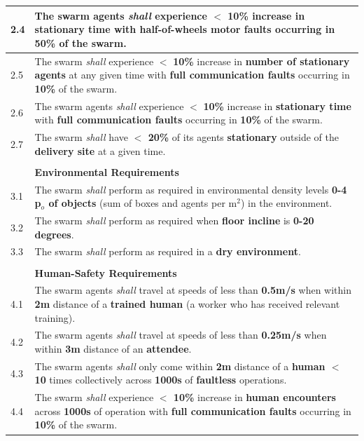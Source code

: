 \documentclass[runningheads]{llncs}
\begin{document}
\begin{table}[!t]
\begin{tabular}{p{5mm} p{125mm} }
		\hline
		2.4 & The swarm agents \emph{shall} experience $<$ \textbf{10\%} increase in \textbf{stationary time} with \textbf{half-of-wheels motor faults} occurring in \textbf{50\%} of  the swarm.\\ 
		\hline
		2.5 & The swarm \emph{shall} experience $<$ \textbf{10\%} increase in \textbf{number of stationary agents} at any given time with \textbf{full communication faults} occurring in \textbf{10\%} of the swarm.\\
		\hline
		2.6 & The swarm agents \emph{shall} experience $<$ \textbf{10\%} increase in \textbf{stationary time} with \textbf{full communication faults} occurring in \textbf{10\%} of the swarm. \\	
		\hline
		2.7 & The swarm \emph{shall} have \textbf{$<$ 20\%} of its agents \textbf{stationary} outside of the \textbf{delivery site} at a given time. \\ 
		\hline \\[-1.25\medskipamount]
		& \textbf{Environmental Requirements} \\ 
		\hline
		3.1 & The swarm \emph{shall} perform as required in environmental density levels \textbf{0-4 p$_o$ of objects} (sum of boxes and agents per m$^2$) in the environment. %
		\\ 
		\hline
		3.2 & The swarm \emph{shall} perform as required when \textbf{floor incline} is \textbf{0-20 degrees}.
		\\ 
		\hline
		3.3 & The swarm \emph{shall} perform as required in a \textbf{dry environment}.
		\\ 
		\hline \\[-1.25\medskipamount]
		& \textbf{Human-Safety Requirements}\\
		\hline
		4.1 & The swarm agents \emph{shall} travel at speeds of less than \textbf{0.5m/s} when within \textbf{2m} distance of a \textbf{trained human} (a worker who has received relevant training).
		\\ 
		\hline
		4.2 & The swarm agents \emph{shall} travel at speeds of less than \textbf{0.25m/s} when within \textbf{3m} distance of an \textbf{attendee}.
		\\ 
		\hline
		4.3 & The swarm agents \emph{shall} only come within \textbf{2m} distance of a \textbf{human $<$ 10} times collectively across \textbf{1000s} of \textbf{faultless} operations.
		\\ 
		\hline
		4.4 & The swarm \emph{shall} experience \textbf{$<$ 10\%} increase in \textbf{human encounters} across \textbf{1000s} of operation with \textbf{full communication faults} occurring in \textbf{10\%} of the swarm. \\

\end{tabular}
\end{table}
\end{document}
